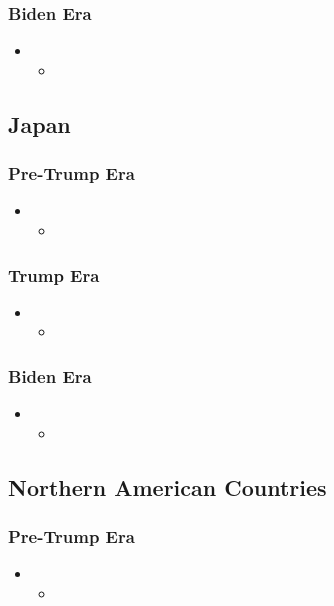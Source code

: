 \documentclass[12pt]{article} %
\begin{document}
		\subsubsection{Biden Era}
			\begin{itemize}
			\item	
				\begin{itemize}
				\item	
				\end{itemize}
			\end{itemize}
			
	\subsection{Japan}
		\subsubsection{Pre-Trump Era}
			\begin{itemize}
			\item	
				\begin{itemize}
				\item	
				\end{itemize}
			\end{itemize}
		\subsubsection{Trump Era}
			\begin{itemize}
			\item	
				\begin{itemize}
				\item	
				\end{itemize}
			\end{itemize}
		\subsubsection{Biden Era}
			\begin{itemize}
			\item	
				\begin{itemize}
				\item	
				\end{itemize}
			\end{itemize}
	
		\subsection{Northern American Countries}
		\subsubsection{Pre-Trump Era}
			\begin{itemize}
			\item	
				\begin{itemize}
				\item	
				\end{itemize}
			\end{itemize}
\end{document}

